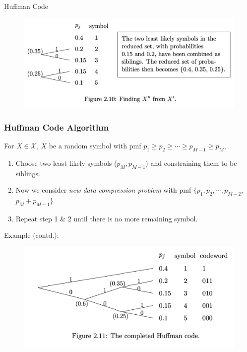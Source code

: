 \documentclass[9pt]{beamer}
\begin{document}
\begin{section}{Huffman Code}
\begin{frame}
            \begin{figure}
                \includegraphics[width=0.8\columnwidth]{image/L3_step2.png}
            \end{figure}
        \end{frame}

        \begin{frame}
            \frametitle{Huffman Code Algorithm}
            For $X \in \mathcal X$, $X$ be a random symbol with pmf $p_1 \ge p_2 \ge \cdots \ge p_{M-1} \ge p_M$,
            \begin{enumerate}
                \item Choose two least likely symbols ($p_M, p_{M-1}$) and constraining them to be siblings.
                \item Now we consider \textit{new data compression problem} with pmf $\{p_1, p_2, \cdots ,p_{M-2},$ \alert{$p_M + p_{M+1}\}$}
                \item Repeat step 1 \& 2 until there is no more remaining symbol.
            \end{enumerate}
            \vspace{0.5cm}
            Example (contd.):

            \begin{figure}
                \includegraphics[width=0.75\columnwidth]{image/L3_step3.png}
            \end{figure}
        \end{frame}
        

\end{section}
\end{document}
